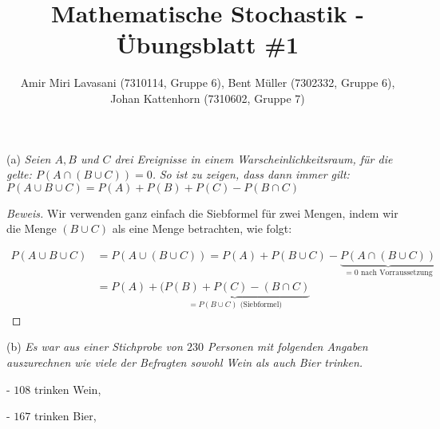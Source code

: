 \documentclass[10pt]{article}
\newenvironment{Aufgabe}[2][Aufgabe]{\begin{trivlist}
\item[\hskip \labelsep {\bfseries #1}\hskip \labelsep {\bfseries #2.}]}{\end{trivlist}}
\begin{document}
 
\title{ \textbf{Mathematische Stochastik - Übungsblatt \#1} }

\author{Amir Miri Lavasani (7310114, Gruppe 6), Bent Müller (7302332, Gruppe 6), \\ 
Johan Kattenhorn (7310602, Gruppe 7)} \maketitle

\begin{Aufgabe}{3}

\end{Aufgabe}

(a) \textit{Seien $A, B$ und $C$ drei Ereignisse in einem Warscheinlichkeitsraum, für die gelte: $P(A \cap (B \cup C)) = 0$.}
\textit{So ist zu zeigen, dass dann immer gilt: $P(A \cup B \cup C) = P(A) + P(B) + P(C) - P(B \cap C)$}
\begin{proof}[Beweis]
Wir verwenden ganz einfach die Siebformel für zwei Mengen, indem wir die Menge $(B \cup C)$ als eine Menge betrachten, wie folgt:

\begin{align*}
P(A \cup B \cup C) &= P(A \cup (B \cup C)) = P(A) + P(B \cup C) - \underbrace{ P(A \cap (B \cup C)) }_{\text{$= 0$ nach Vorraussetzung}} \\
&= P(A) + \underbrace{(P(B) + P(C) - (B \cap C)}_{\text{$= P(B \cup C)$ (Siebformel)}}
\end{align*}

\end{proof}

(b) \textit{Es war aus einer Stichprobe von $230$ Personen mit folgenden Angaben auszurechnen wie viele der Befragten sowohl Wein als auch Bier trinken.}

- $108$ trinken Wein,

- $167$ trinken Bier,
\end{document}
